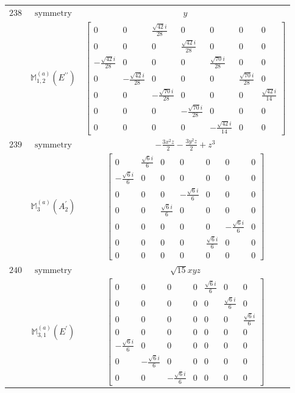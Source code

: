 \documentclass[fleqn,8pt,landscape]{jsarticle}
\begin{document}
\begin{longtable}{ccc}
$ 238 $ & $ \text{symmetry} $ & $ y $ \\
$  $ & $ \mathbb{M}_{1,2}^{(a)}(E^{\prime\prime}) $ & $ \begin{bmatrix} 0 & 0 & \frac{\sqrt{42} i}{28} & 0 & 0 & 0 & 0 \\ 0 & 0 & 0 & \frac{\sqrt{42} i}{28} & 0 & 0 & 0 \\ - \frac{\sqrt{42} i}{28} & 0 & 0 & 0 & \frac{\sqrt{70} i}{28} & 0 & 0 \\ 0 & - \frac{\sqrt{42} i}{28} & 0 & 0 & 0 & \frac{\sqrt{70} i}{28} & 0 \\ 0 & 0 & - \frac{\sqrt{70} i}{28} & 0 & 0 & 0 & \frac{\sqrt{42} i}{14} \\ 0 & 0 & 0 & - \frac{\sqrt{70} i}{28} & 0 & 0 & 0 \\ 0 & 0 & 0 & 0 & - \frac{\sqrt{42} i}{14} & 0 & 0 \end{bmatrix} $ \\ \hline
$ 239 $ & $ \text{symmetry} $ & $ - \frac{3 x^{2} z}{2} - \frac{3 y^{2} z}{2} + z^{3} $ \\
$  $ & $ \mathbb{M}_{3}^{(a)}(A_{2}^{\prime}) $ & $ \begin{bmatrix} 0 & \frac{\sqrt{6} i}{6} & 0 & 0 & 0 & 0 & 0 \\ - \frac{\sqrt{6} i}{6} & 0 & 0 & 0 & 0 & 0 & 0 \\ 0 & 0 & 0 & - \frac{\sqrt{6} i}{6} & 0 & 0 & 0 \\ 0 & 0 & \frac{\sqrt{6} i}{6} & 0 & 0 & 0 & 0 \\ 0 & 0 & 0 & 0 & 0 & - \frac{\sqrt{6} i}{6} & 0 \\ 0 & 0 & 0 & 0 & \frac{\sqrt{6} i}{6} & 0 & 0 \\ 0 & 0 & 0 & 0 & 0 & 0 & 0 \end{bmatrix} $ \\ \hline
$ 240 $ & $ \text{symmetry} $ & $ \sqrt{15} x y z $ \\
$  $ & $ \mathbb{M}_{3,1}^{(a)}(E^{\prime}) $ & $ \begin{bmatrix} 0 & 0 & 0 & 0 & \frac{\sqrt{6} i}{6} & 0 & 0 \\ 0 & 0 & 0 & 0 & 0 & \frac{\sqrt{6} i}{6} & 0 \\ 0 & 0 & 0 & 0 & 0 & 0 & \frac{\sqrt{6} i}{6} \\ 0 & 0 & 0 & 0 & 0 & 0 & 0 \\ - \frac{\sqrt{6} i}{6} & 0 & 0 & 0 & 0 & 0 & 0 \\ 0 & - \frac{\sqrt{6} i}{6} & 0 & 0 & 0 & 0 & 0 \\ 0 & 0 & - \frac{\sqrt{6} i}{6} & 0 & 0 & 0 & 0 \end{bmatrix} $ \\ \hline

\end{longtable}
\end{document}
